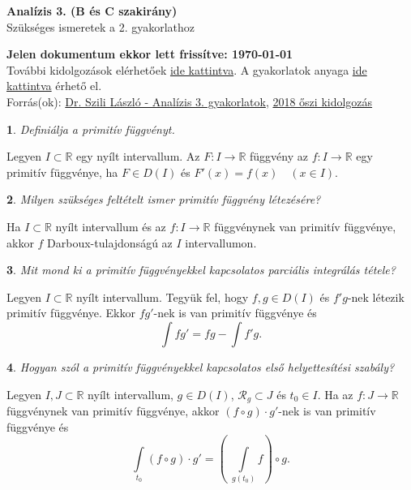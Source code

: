\documentclass[a4paper]{article}
\def\R{\mathbb{R}}
\theoremstyle{qstyle}
\newtheorem{question}{}{}
\begin{document}
	\begin{center}
		{\Large\textbf{Analízis 3. (B és C szakirány)}}\\
		{\Large Szükséges ismeretek a 2. gyakorlathoz}
	\end{center}
	
	\begin{framed}
		\textbf{Jelen dokumentum ekkor lett frissítve: {\yyyymmdddate\today} \ \currenttime}\\
		További kidolgozások elérhetőek \href{https://people.inf.elte.hu/totadavid95/Analizis3/2019-tavasz/}{ide kattintva}. A gyakorlatok anyaga \href{http://numanal.inf.elte.hu/~szili/Oktatas/An3_BC_szakirany_2019/An3_BC_gyak_2019_tavasz.pdf}{ide kattintva} érhető el.\\	
		Forrás(ok): \href{http://numanal.inf.elte.hu/~szili/Oktatas/An3_BC_szakirany_2019/An3_BC_gyak_2019_tavasz.pdf}{Dr. Szili László - Analízis 3. gyakorlatok}, \href{https://people.inf.elte.hu/totadavid95/Analizis3/Anal3_def.pdf}{2018 őszi kidolgozás}
	\end{framed}
	
	\begin{question}
		Definiálja a primitív függvényt.
	\end{question}
	Legyen $I \subset \R$ egy nyílt intervallum. Az $F:I\to\R$ függvény az $f:I\to\R$ egy primitív függvénye, ha $F\in D(I)$ és $F'(x)=f(x)  \quad  (x\in I)$.
	
	\begin{question}
		Milyen \emph{szükséges} feltételt ismer primitív függvény létezésére?
	\end{question}
	Ha $I \subset \R$ nyílt intervallum és az $f:I\to\R$ függvénynek van primitív függvénye, akkor $f$ Darboux-tulajdonságú az $I$ intervallumon.
	
		\begin{question}
		Mit mond ki a primitív függvényekkel kapcsolatos \emph{parciális integrálás tétele}?
	\end{question}
	Legyen $I\subset\R$ nyílt intervallum. Tegyük fel, hogy $f,g\in D(I)$ és $f'g$-nek létezik primitív függvénye. Ekkor $fg'$-nek is van primitív függvénye és
	$$\int fg' = fg-\int f'g \text{.} $$
	
	\begin{question}
		Hogyan szól a primitív függvényekkel kapcsolatos \emph{első helyettesítési szabály}?
	\end{question}
	Legyen $I,J \subset \R$ nyílt intervallum, $g \in D(I)$, $\mathcal{R}_g \subset J$ és $t_0 \in I$. Ha az $f : J \to \R$ függvénynek van primitív függvénye, akkor $(f \circ g) \cdot g'$-nek is van primitív függvénye és
	$$ \int\limits_{t_0}(f \circ g) \cdot g' = \left(\; \int\limits_{g(t_0)} f \right) \circ g \text{.} $$
	
\end{document}
